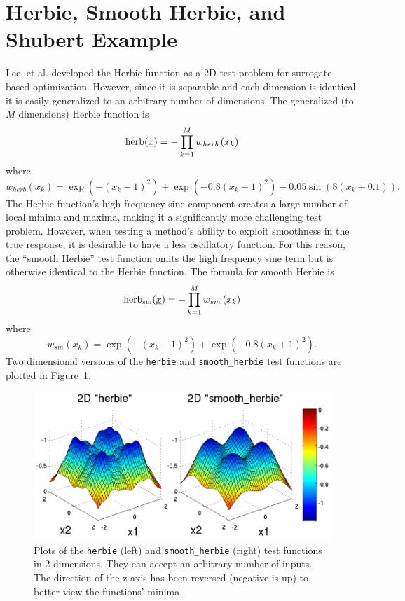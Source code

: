 \section{Herbie, Smooth Herbie, and Shubert Example}
Lee, et al. \cite{herbiefunc} developed the Herbie function as a 2D
test problem for surrogate-based optimization. However, since it is
separable and each dimension is identical it is easily generalized to
an arbitrary number of dimensions.  The generalized (to $M$
dimensions) Herbie function is
\begin{displaymath}
{\rm herb}(\underline{x})=-\prod_{k=1}^M w_{herb}\left(x_k\right)
\end{displaymath}
where 
\begin{displaymath}
w_{herb}\left(x_k\right)=\exp(-(x_k-1)^2)+\exp(-0.8(x_k+1)^2)-0.05\sin\left(8\left(x_k+0.1\right)\right).
\end{displaymath}
The Herbie function's high frequency sine component creates a large
number of local minima and maxima, making it a significantly more
challenging test problem.  However, when testing a method's ability to
exploit smoothness in the true response, it is desirable to have a
less oscillatory function.  For this reason, the ``smooth Herbie''
test function omits the high frequency sine term but is otherwise
identical to the Herbie function.  The formula for smooth Herbie is
\begin{displaymath}
{\rm herb_{sm}}(\underline{x})=-\prod_{k=1}^M w_{sm}\left(x_k\right)
\end{displaymath}
where 
\begin{displaymath}
w_{sm}\left(x_k\right)=\exp(-(x_k-1)^2)+\exp(-0.8(x_k+1)^2).
\end{displaymath}
Two dimensional versions of the \texttt{herbie} and \texttt{smooth\_herbie} 
test functions are plotted in Figure~\ref{fig:2D_herbie__smooth_herbie}.
\begin{figure}
  \centering
  \centerline{\includegraphics[scale=1.0]{images/DAK5pt2_2D__herbie__smooth_herbie}}
  \caption{Plots of the \texttt{herbie} (left) and
           \texttt{smooth\_herbie} (right) test functions in 2
           dimensions.  They can accept an arbitrary number of
           inputs.  The direction of the z-axis has been reversed 
           (negative is up) to better view the functions' minima.}
  \label{fig:2D_herbie__smooth_herbie}
\end{figure}

